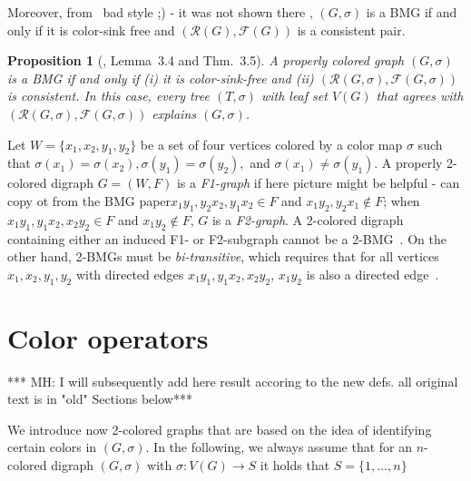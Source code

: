 \documentclass[final,3p,times]{elsarticle}
\newtheorem{proposition}[theorem]{Proposition}%
\newcommand{\TODO}[1]{\begingroup\color{red}#1\endgroup}
\newcommand{\OLD}[1]{\begingroup\tiny\color{gray}#1\endgroup}
\newcommand{\mh}[1]{\begingroup\color{blue}#1\endgroup}
\begin{document}
\OLD{
Moreover, from~\cite[Proposition~2.3]{korchmaros2021quasi} \TODO{bad style ;) - it was not shown there }, $(G,\sigma)$ is a BMG if and only if it is color-sink free and $(\mathscr{R}(G),\mathscr{F}(G))$ is a consistent pair. }

\mh{
\begin{proposition}[\cite{Schaller:21b}, Lemma~3.4 and Thm.~3.5]
  \label{prop:BMG-triple-charac}
  A properly colored graph $(G,\sigma)$ is a BMG if and only if (i) it is
  color-sink-free and (ii) $(\mathscr{R}(G,\sigma),\mathscr{F}(G,\sigma))$
  is consistent.  In this case, every tree $(T,\sigma)$ with leaf set
  $V(G)$ that agrees with $(\mathscr{R}(G,\sigma),\mathscr{F}(G,\sigma))$
  explains $(G,\sigma)$.
\end{proposition}
}

Let $W=\{x_1,x_2,y_1,y_2\}$ be a set of four vertices colored by a color map $\sigma$ such that $\sigma(x_1)=\sigma(x_2),\sigma(y_1)=\sigma(y_2),$ and $\sigma(x_1)\neq \sigma(y_1)$. A properly 2-colored digraph $G=(W,F)$ is a \emph{F1-graph} if \TODO{here picture might be helpful - can copy ot from the BMG paper}$x_1y_1,y_2x_2,y_1x_2 \in F$ and $x_1 y_2,y_2x_1 \notin F$; when $x_1y_1,y_1x_2,x_2y_2 \in F$ and $x_1y_2 \notin F$, $G$ is a \emph{F2-graph}. A 2-colored digraph containing either an induced F1- or F2-subgraph cannot be a 2-BMG~\cite[Lemma 4.2]{schaller2021complexity}. On the other hand, 2-BMGs must be \emph{bi-transitive}, which requires that for all vertices $x_1, x_2, y_1, y_2$ with directed edges $x_1y_1, y_1x_2, x_2y_2$, $x_1y_2$ is also a directed edge~\cite{Korchmaros:21a}.

\section{Color operators}
\label{sec:operators}

\TODO{ *** MH: I will subsequently add here result accoring to the new defs. all
original text is in "old" Sections below***}


\mh{ We introduce now 2-colored graphs that are based on the idea of identifying
certain colors in $(G,\sigma)$. In the following, we always assume that 
for an $n$-colored digraph $(G,\sigma)$ with $\sigma\colon V(G) \to S$ 
it holds that $S = \{1,\dots,n\}$}
\end{document}
